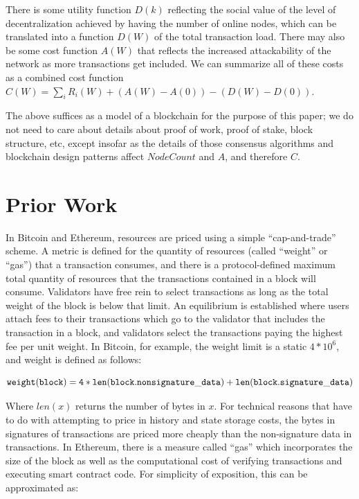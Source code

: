 \documentclass[12pt, final]{article}
\begin{document}
There is some utility function $D(k)$ reflecting the social value of the level of decentralization achieved by having the number of online nodes, which can be translated into a function $D(W)$ of the total transaction load. There may also be some cost function $A(W)$ that reflects the increased attackability of the network as more transactions get included. We can summarize all of these costs as a combined cost function $C(W) = \sum_i R_i(W) + (A(W) - A(0)) - (D(W) - D(0))$.

The above suffices as a model of a blockchain for the purpose of this paper; we do not need to care about details about proof of work, proof of stake, block structure, etc, except insofar as the details of those consensus algorithms and blockchain design patterns affect $NodeCount$ and $A$, and therefore $C$.

\section{Prior Work}

In Bitcoin and Ethereum, resources are priced using a simple ``cap-and-trade'' scheme. A metric is defined for the quantity of resources (called ``weight'' or ``gas'') that a transaction consumes, and there is a protocol-defined maximum total quantity of resources that the transactions contained in a block will consume. Validators have free rein to select transactions as long as the total weight of the block is below that limit. An equilibrium is established where users attach fees to their transactions which go to the validator that includes the transaction in a block, and validators select the transactions paying the highest fee per unit weight. In Bitcoin, for example, the weight limit is a static $4 *10^6$, and weight is defined as follows\cite{weightunits}:

\begin{scriptsize}
\begin{equation}
\tt{weight(block) = 4 * len(block.nonsignature\_data) + len(block.signature\_data)}
\end{equation}
\end{scriptsize}

Where $len(x)$ returns the number of bytes in $x$. For technical reasons that have to do with attempting to price in history and state storage costs, the bytes in signatures of transactions are priced more cheaply than the non-signature data in transactions. In Ethereum, there is a measure called ``gas'' which incorporates the size of the block as well as the computational cost of verifying transactions and executing smart contract code. For simplicity of exposition, this can be approximated as:
\end{document}
